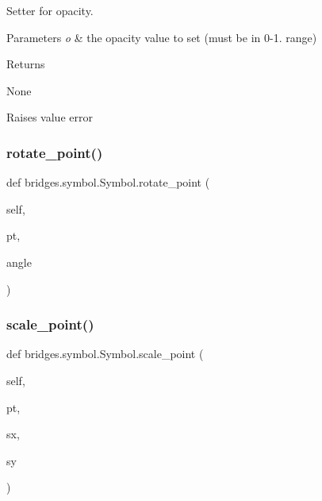 Setter for opacity. 


\begin{DoxyParams}{Parameters}
{\em o} & the opacity value to set (must be in 0-\/1. range) \\
\hline
\end{DoxyParams}
\begin{DoxyReturn}{Returns}


None 

Raises value error 
\end{DoxyReturn}
\mbox{\label{classbridges_1_1symbol_1_1_symbol_a81d55230ba4fec6c9a31d76cfc97bc96}} 
\subsubsection{\texorpdfstring{rotate\+\_\+point()}{rotate\_point()}}
{\footnotesize\ttfamily def bridges.\+symbol.\+Symbol.\+rotate\+\_\+point (\begin{DoxyParamCaption}\item[{}]{self,  }\item[{}]{pt,  }\item[{}]{angle }\end{DoxyParamCaption})}

\mbox{\label{classbridges_1_1symbol_1_1_symbol_a963b55370096aa7314b03a2a34da2929}} 
\subsubsection{\texorpdfstring{scale\+\_\+point()}{scale\_point()}}
{\footnotesize\ttfamily def bridges.\+symbol.\+Symbol.\+scale\+\_\+point (\begin{DoxyParamCaption}\item[{}]{self,  }\item[{}]{pt,  }\item[{}]{sx,  }\item[{}]{sy }\end{DoxyParamCaption})}

